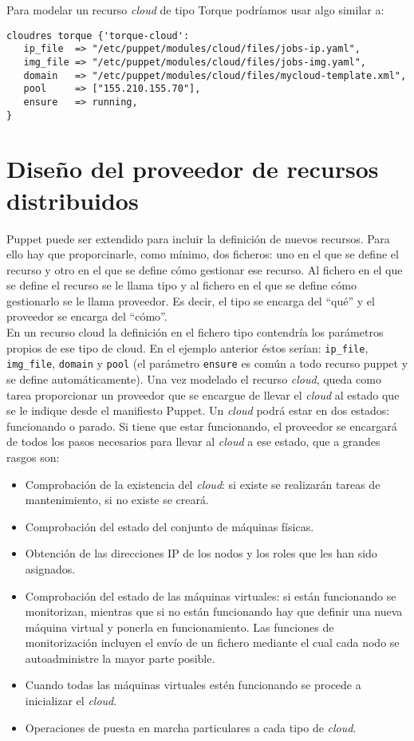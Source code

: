 Para modelar un recurso \emph{cloud} de tipo Torque podríamos usar algo similar a:

\begin{lstlisting}
cloudres torque {'torque-cloud':
   ip_file  => "/etc/puppet/modules/cloud/files/jobs-ip.yaml",
   img_file => "/etc/puppet/modules/cloud/files/jobs-img.yaml",
   domain   => "/etc/puppet/modules/cloud/files/mycloud-template.xml",
   pool     => ["155.210.155.70"],
   ensure   => running,
}
\end{lstlisting}


\section{Diseño del proveedor de recursos distribuidos}

Puppet puede ser extendido para incluir la definición de nuevos recursos. Para ello hay que proporcinarle, como mínimo, dos ficheros: uno en el que se define el recurso y otro en el que se define cómo gestionar ese recurso. Al fichero en el que se define el recurso se le llama tipo y al fichero en el que se define cómo gestionarlo se le llama proveedor. Es decir, el tipo se encarga del ``qué'' y el proveedor se encarga del ``cómo''.\\

En un recurso cloud la definición en el fichero tipo contendría los parámetros propios de ese tipo de cloud. En el ejemplo anterior éstos serían: \texttt{ip\_file}, \texttt{img\_file}, \texttt{domain} y \texttt{pool} (el parámetro \texttt{ensure} es común a todo recurso puppet y se define automáticamente). Una vez modelado el recurso \emph{cloud}, queda como tarea proporcionar un proveedor que se encargue de llevar el \emph{cloud} al estado que se le indique desde el manifiesto Puppet. Un \emph{cloud} podrá estar en dos estados: funcionando o parado. Si tiene que estar funcionando, el proveedor se encargará de todos los pasos necesarios para llevar al \emph{cloud} a ese estado, que a grandes rasgos son:

\begin{itemize}
\item Comprobación de la existencia del \emph{cloud}: si existe se realizarán tareas de mantenimiento, si no existe se creará.
\item Comprobación del estado del conjunto de máquinas físicas.
\item Obtención de las direcciones IP de los nodos y los roles que les han sido asignados.
\item Comprobación del estado de las máquinas virtuales: si están funcionando se monitorizan, mientras que si no están funcionando hay que definir una nueva máquina virtual y ponerla en funcionamiento. Las funciones de monitorización incluyen el envío de un fichero mediante el cual cada nodo se autoadministre la mayor parte posible.
\item Cuando todas las máquinas virtuales estén funcionando se procede a inicializar el \emph{cloud}.
\item Operaciones de puesta en marcha particulares a cada tipo de \emph{cloud}.
\end{itemize}

